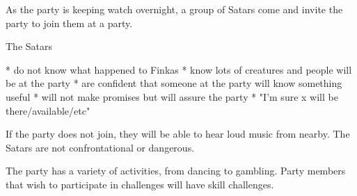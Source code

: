 As the party is keeping watch overnight, a group of Satars come and invite the party to join them at a party.

The Satars

* do not know what happened to Finkas
* know lots of creatures and people will be at the party
* are confident that someone at the party will know something useful
* will not make promises but will assure the party
* "I'm sure x will be there/available/etc"

If the party does not join, they will be able to hear loud music from nearby.
The Satars are not confrontational or dangerous.

The party has a variety of activities, from dancing to gambling.
Party members that wish to participate in challenges will have skill challenges.

